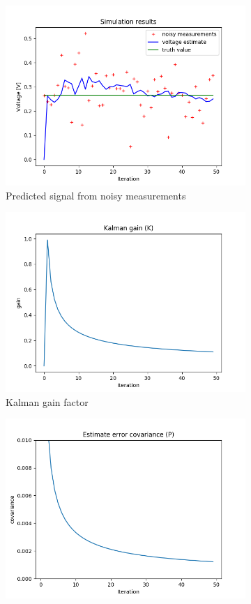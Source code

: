 \documentclass{article}
\begin{document}
    \begin{figure}
        \begin{subfigure} {.5\textwidth}  
            \centering 
            \includegraphics[width=0.8\linewidth]{./img/r01q_.png}
            \caption{Predicted signal from noisy measurements }
        \end{subfigure}
        \begin{subfigure}{.5\textwidth}            
            \centering
            \includegraphics[width=0.8\linewidth]{./img/r01q_K.png}
            \caption{Kalman gain factor}
        \end{subfigure}
        \begin{subfigure} {.5\textwidth}  
            \centering 
            \includegraphics[width=0.8\linewidth]{./img/r01q_P.png}

\end{subfigure}
\end{figure}
\end{document}
